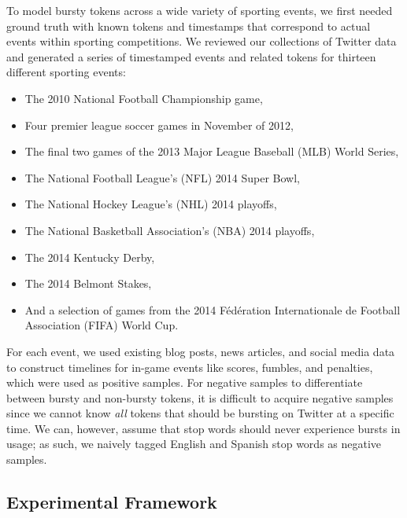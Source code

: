 \documentclass{acm_proc_article-sp}
\begin{document}
To model bursty tokens across a wide variety of sporting events, we first needed ground truth with known tokens and timestamps that correspond to actual events within sporting competitions.
We reviewed our collections of Twitter data and generated a series of timestamped events and related tokens for thirteen different sporting events: 

\begin{itemize}
\item The 2010 National Football Championship game, 
\item Four premier league soccer games in November of 2012, %
\item The final two games of the 2013 Major League Baseball (MLB) World Series, 
\item The National Football League's (NFL) 2014 Super Bowl, 
\item The National Hockey League's (NHL) 2014 playoffs, 
\item The National Basketball Association's (NBA) 2014 playoffs, 
\item The 2014 Kentucky Derby, 
\item The 2014 Belmont Stakes, 
\item And a selection of games from the 2014 F\'{e}d\'{e}ration Internationale de Football Association (FIFA) World Cup.
\end{itemize}

For each event, we used existing blog posts, news articles, and social media data to construct timelines for in-game events like scores, fumbles, and penalties, which were used as positive samples.
For negative samples to differentiate between bursty and non-bursty tokens, it is difficult to acquire negative samples since we cannot know \emph{all} tokens that should be bursting on Twitter at a specific time.
We can, however, assume that stop words should never experience bursts in usage; as such, we naively tagged English and Spanish stop words as negative samples.

\subsection{Experimental Framework}
\end{document}
